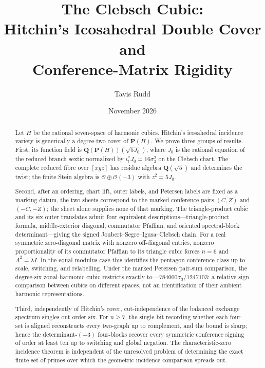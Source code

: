 \documentclass[11pt]{article}
\title{The Clebsch Cubic:\\
Hitchin's Icosahedral Double Cover and\\
Conference-Matrix Rigidity}
\author{Tavis Rudd}
\date{November 2026}
\theoremstyle{remark}
\newcommand{\Q}{\mathbf Q}
\begin{document}
\maketitle

\begin{abstract}
Let \(H\) be the rational seven-space of harmonic cubics.  Hitchin's
icosahedral incidence variety is generically a degree-two cover of
\(\mathbf P(H)\).  We prove three groups of results.  First, its function
field is
\(\Q(\mathbf P(H))(\sqrt{5J_0})\), where \(J_0\) is the rational equation
of the reduced branch sextic normalized by \(\iota_t^*J_0=16\sigma_3^2\)
on the Clebsch chart.  The complete reduced fibre over \([xyz]\) has
residue algebra \(\Q(\sqrt5)\) and determines the twist; the finite Stein
algebra is \(\mathcal O\oplus\mathcal O(-3)\) with \(z^2=5J_0\).

Second, after an ordering, chart lift, outer labels, and Petersen labels are
fixed as a marking datum, the two sheets correspond to the marked conference
pairs \((C,Z)\) and \((-C,-Z)\); the sheet alone supplies none of that marking.
The triangle-product cubic and its six outer translates admit four equivalent
descriptions---triangle-product formula, middle-exterior diagonal, commutator
Pfaffian, and oriented spectral-block determinant---giving the signed
Joubert--Segre--Igusa--Clebsch chain.  For a real symmetric zero-diagonal
matrix with nonzero off-diagonal entries, nonzero proportionality of its
commutator Pfaffian to its triangle cubic forces \(n=6\) and
\(A^2=\lambda I\).  In the equal-modulus case this identifies the pentagon
conference class up to scale, switching, and relabelling.  Under the marked
Petersen pair-sum comparison, the degree-six zonal-harmonic cubic restricts
exactly to
\(-784000\sigma_3/1247103\): a relative sign comparison between cubics on
different spaces, not an identification of their ambient harmonic
representations.

Third, independently of Hitchin's cover, cut-independence of the balanced
exchange spectrum singles out order six.  For \(n\geq7\), the single bit
recording whether each four-set is aligned reconstructs every two-graph up to
complement, and the bound is sharp; hence the determinant-\((-3)\) four-blocks
recover every symmetric conference signing of order at least ten up to
switching and global negation.  The characteristic-zero incidence theorem is
independent of the unresolved problem of determining the exact finite set of
primes over which the geometric incidence comparison spreads out.
\end{abstract}
\end{document}
